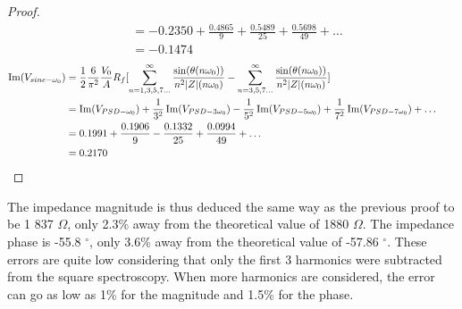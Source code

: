 \begin{proof}
\begin{align*}
       &=  -0.2350 + \frac{0.4865}{9} + \frac{0.5489}{25} + \frac{0.5698}{49} + \dots\nonumber\\
       &= -0.1474\nonumber
   \end{align*}
   \begin{align*}
       \Im(V_{sine-\omega_0}) &= \frac{1}{2} \frac{6}{\pi^2} \frac{V_0}{A} R_f [ \displaystyle\sum_{n=1,3,5,7...} ^{\infty} \frac{\sin(\theta(n \omega_0))}{n^2\lvert Z \rvert (n \omega_0)} - \displaystyle\sum_{n=3,5,7...} ^{\infty} \frac{\sin(\theta(n \omega_0))}{n^2\lvert Z \rvert (n \omega_0)}]\nonumber\\
       &= \Im(V_{PSD-\omega_0}) + \frac{1}{3^2}\Im(V_{PSD-3\omega_0}) - \frac{1}{5^2}\Im(V_{PSD-5\omega_0}) + \frac{1}{7^2}\Im(V_{PSD-7\omega_0}) + \dots\nonumber\\
       &=  0.1991 + \frac{0.1906}{9} - \frac{0.1332}{25} + \frac{0.0994}{49} + \dots\nonumber\\
       &= 0.2170\nonumber &&\qedhere
    \end{align*}
\end{proof}
The impedance magnitude is thus deduced the same way as the previous proof to be 1 837 $\Omega$, only 2.3\% away from the theoretical value of 1880 $\Omega$. The impedance phase is -55.8 $^{\circ}$, only 3.6\% away from the theoretical value of -57.86 $^\circ$. These errors are quite low considering that only the first 3 harmonics were subtracted from the square spectroscopy. When more harmonics are considered, the error can go as low as 1\% for the magnitude and 1.5\% for the phase.